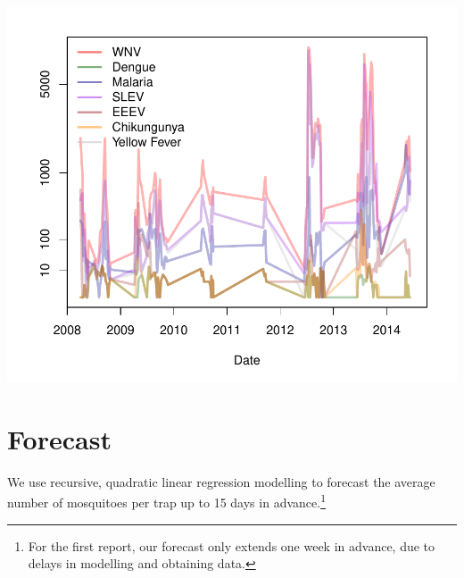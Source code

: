 \documentclass{article}
\begin{document}
\begin{multicols}{2}
\includegraphics{mosquitoReport-005}

\vfill
\newpage
\end{multicols}

\section*{Forecast}
\hrulefill
\vspace{5mm}

\noindent We use recursive, quadratic linear regression modelling to forecast the average number of mosquitoes per trap up to 15 days in advance.\footnote{For the first report, our forecast only extends one week in advance, due to delays in modelling and obtaining data.}  
\end{document}
